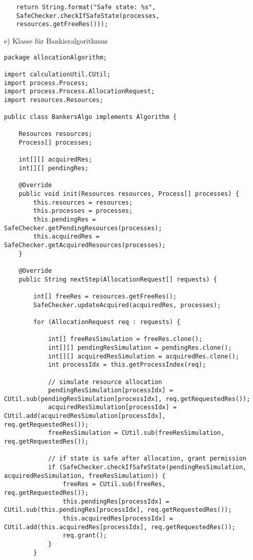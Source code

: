 \begin{enumerate}
\begin{enumerate}
\begin{lstlisting}[style=java]
return String.format("Safe state: %s", SafeChecker.checkIfSafeState(processes, resources.getFreeRes()));
\end{lstlisting}


\end{enumerate}

\item[e)]
Klasse für Bankieralgorithmus

\begin{lstlisting}[style=java]
package allocationAlgorithm;

import calculationUtil.CUtil;
import process.Process;
import process.Process.AllocationRequest;
import resources.Resources;

public class BankersAlgo implements Algorithm {

    Resources resources;
    Process[] processes;

    int[][] acquiredRes;
    int[][] pendingRes;

    @Override
    public void init(Resources resources, Process[] processes) {
        this.resources = resources;
        this.processes = processes;
        this.pendingRes = SafeChecker.getPendingResources(processes);
        this.acquiredRes = SafeChecker.getAcquiredResources(processes);
    }

    @Override
    public String nextStep(AllocationRequest[] requests) {

        int[] freeRes = resources.getFreeRes();
        SafeChecker.updateAcquired(acquiredRes, processes);

        for (AllocationRequest req : requests) {

            int[] freeResSimulation = freeRes.clone();
            int[][] pendingResSimulation = pendingRes.clone();
            int[][] acquiredResSimulation = acquiredRes.clone();
            int processIdx = this.getProcessIndex(req);

            // simulate resource allocation
            pendingResSimulation[processIdx] = CUtil.sub(pendingResSimulation[processIdx], req.getRequestedRes());
            acquiredResSimulation[processIdx] = CUtil.add(acquiredResSimulation[processIdx], req.getRequestedRes());
            freeResSimulation = CUtil.sub(freeResSimulation, req.getRequestedRes());

            // if state is safe after allocation, grant permission
            if (SafeChecker.checkIfSafeState(pendingResSimulation, acquiredResSimulation, freeResSimulation)) {
                freeRes = CUtil.sub(freeRes, req.getRequestedRes());
                this.pendingRes[processIdx] = CUtil.sub(this.pendingRes[processIdx], req.getRequestedRes());
                this.acquiredRes[processIdx] = CUtil.add(this.acquiredRes[processIdx], req.getRequestedRes());
                req.grant();
            }
        }


\end{lstlisting}
\end{enumerate}
